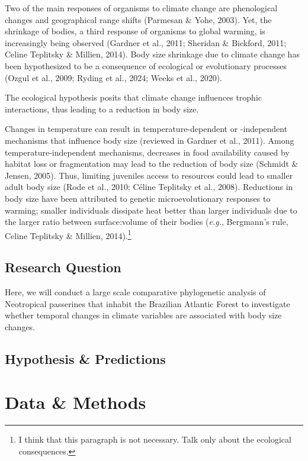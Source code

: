 \documentclass[
]{agujournal2019}
\begin{document}
Two of the main responses of organisms to climate change are
phenological changes and geographical range shifts (Parmesan \& Yohe,
2003). Yet, the shrinkage of bodies, a third response of organisms to
global warming, is increasingly being observed (Gardner et al., 2011;
Sheridan \& Bickford, 2011; Celine Teplitsky \& Millien, 2014). Body
size shrinkage due to climate change has been hypothesized to be a
consequence of ecological or evolutionary processes (Ozgul et al., 2009;
Ryding et al., 2024; Weeks et al., 2020).

The ecological hypothesis posits that climate change influences trophic
interactions, thus leading to a reduction in body size.

Changes in temperature can result in temperature-dependent or
-independent mechanisms that influence body size (reviewed in Gardner et
al., 2011). Among temperature-independent mechanisms, decreases in food
availability caused by habitat loss or fragmentation may lead to the
reduction of body size (Schmidt \& Jensen, 2005). Thus, limiting
juveniles access to resources could lead to smaller adult body size
(Rode et al., 2010; Céline Teplitsky et al., 2008). Reductions in body
size have been attributed to genetic microevolutionary responses to
warming; smaller individuals dissipate heat better than larger
individuals due to the larger ratio between surface:volume of their
bodies (\emph{e.g.}, Bergmann's rule, Celine Teplitsky \& Millien,
2014).\footnote{I think that this paragraph is not necessary. Talk only
  about the ecological consequences.}

\subsection{Research Question}\label{research-question}

Here, we will conduct a large scale comparative phylogenetic analysis of
Neotropical passerines that inhabit the Brazilian Atlantic Forest to
investigate whether temporal changes in climate variables are associated
with body size changes.

\subsection{Hypothesis \& Predictions}\label{hypothesis-predictions}

\section{Data \& Methods}\label{sec-data-methods}
\end{document}
